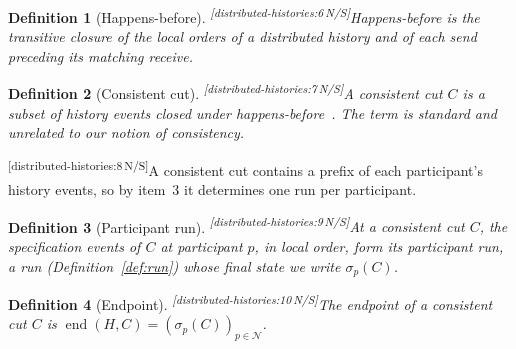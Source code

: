 \documentclass[sigconf]{cidr-2027}
\newtheorem{definition}{Definition}
\theoremstyle{remark}
\newcommand{\cxtag}[2]{\textsuperscript{\textsf{\tiny[#1\,#2]}}}
\begin{document}
\color{black}\begin{definition}[Happens-before]
\label{def:happens-before}
\cxtag{distributed-histories:6}{N/S}\emph{Happens-before} is the transitive closure of the local orders of a
distributed history and of each send preceding its matching receive.\color{black}
\end{definition}

\color{black}\begin{definition}[Consistent cut]
\label{def:consistent-cut}
\cxtag{distributed-histories:7}{N/S}A \emph{consistent cut} $C$ is a subset of history events closed under happens-before~\cite{lamport1978time,chandy1985distributed}.  The term is standard and unrelated to our notion of consistency.\color{black}
\end{definition}

\color{black}\cxtag{distributed-histories:8}{N/S}A consistent cut contains a prefix of each participant's history events, so by
item~3
it determines one run per participant.\color{black}

\color{black}\begin{definition}[Participant run]
\label{def:participant-run}
\cxtag{distributed-histories:9}{N/S}At a consistent cut $C$, the specification events of $C$ at participant $p$,
in local order, form its \emph{participant run}, a run
(Definition~\ref{def:run}) whose final state we write $\sigma_p(C)$.\color{black}
\end{definition}

\color{black}\begin{definition}[Endpoint]
\label{def:endpoint}
\cxtag{distributed-histories:10}{N/S}The \emph{endpoint} of a consistent cut $C$ is
$\operatorname{end}(H,C)=(\sigma_p(C))_{p\in\mathcal N}$.\color{black}
\end{definition}
\end{document}
